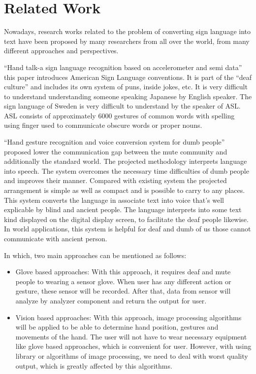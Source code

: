 
\chapter{Related Work}
    Nowadays, research works related to the problem of converting sign language into text 
    have been proposed by many researchers from all over the world, from many different 
    approaches and perspectives.

    “Hand talk-a sign language recognition based on
    accelerometer and semi data” this paper introduces American
    Sign Language conventions. It is part of the “deaf culture” and
    includes its own system of puns, inside jokes, etc. It is very
    difficult to understand understanding someone speaking
    Japanese by English speaker. The sign language of Sweden is
    very difficult to understand by the speaker of ASL. ASL
    consists of approximately 6000 gestures of common words
    with spelling using finger used to communicate obscure words
    or proper nouns.

    “Hand gesture recognition and voice conversion system for
    dumb people” proposed lower the communication gap
    between the mute community and additionally the standard
    world. The projected methodology interprets language into
    speech. The system overcomes the necessary time difficulties
    of dumb people and improves their manner. Compared with
    existing system the projected arrangement is simple as well as
    compact and is possible to carry to any places. This system
    converts the language in associate text into voice that's well
    explicable by blind and ancient people. The language
    interprets into some text kind displayed on the digital display
    screen, to facilitate the deaf people likewise. In world
    applications, this system is helpful for deaf and dumb of us
    those cannot communicate with ancient person.

    In which, two main approaches can be mentioned as follows:
    \begin{itemize}
      \item Glove based approaches:
      With this approach, it requires deaf and mute people to wearing a sensor glove. When user
      has any different action or gesture, these sensor will be recorded. After that, data from
      sensor will analyze by analyzer component and return the output for user.
      \item Vision based approaches:
      With this approach, image processing algorithms will be applied to be able to determine
      hand position, gestures and movements of the hand. The user will not have to wear necessary
      equipment like glove based approaches, which is convenient for user. However, with using
      library or algorithms of image processing, we need to deal with worst quality output, which is
      greatly affected by this algorithms.
    \end{itemize}

